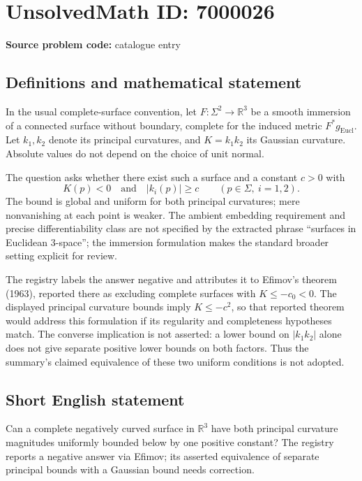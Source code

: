 \documentclass[11pt]{article}
\newcommand{\R}{\mathbb{R}}
\begin{document}
\section*{UnsolvedMath ID: 7000026}
\textbf{Source problem code:} catalogue entry
\subsection{Definitions and mathematical statement}
In the usual complete-surface convention, let \(F:\Sigma^2\to\R^3\) be a smooth immersion of a connected surface without boundary, complete for the induced metric \(F^*g_{\mathrm{Eucl}}\). Let \(k_1,k_2\) denote its principal curvatures, and \(K=k_1k_2\) its Gaussian curvature. Absolute values do not depend on the choice of unit normal.

The question asks whether there exist such a surface and a constant \(c>0\) with
\[
 K(p)<0\quad\text{and}\quad |k_i(p)|\geq c
 \qquad(p\in\Sigma,\ i=1,2).
\]
The bound is global and uniform for both principal curvatures; mere nonvanishing at each point is weaker. The ambient embedding requirement and precise differentiability class are not specified by the extracted phrase ``surfaces in Euclidean 3-space''; the immersion formulation makes the standard broader setting explicit for review.

The registry labels the answer negative and attributes it to Efimov's theorem (1963), reported there as excluding complete surfaces with \(K\leq-c_0<0\). The displayed principal curvature bounds imply \(K\leq-c^2\), so that reported theorem would address this formulation if its regularity and completeness hypotheses match. The converse implication is not asserted: a lower bound on \(|k_1k_2|\) alone does not give separate positive lower bounds on both factors. Thus the summary's claimed equivalence of these two uniform conditions is not adopted.
\subsection{Short English statement}
Can a complete negatively curved surface in \(\R^3\) have both principal curvature magnitudes uniformly bounded below by one positive constant? The registry reports a negative answer via Efimov; its asserted equivalence of separate principal bounds with a Gaussian bound needs correction.
\end{document}
